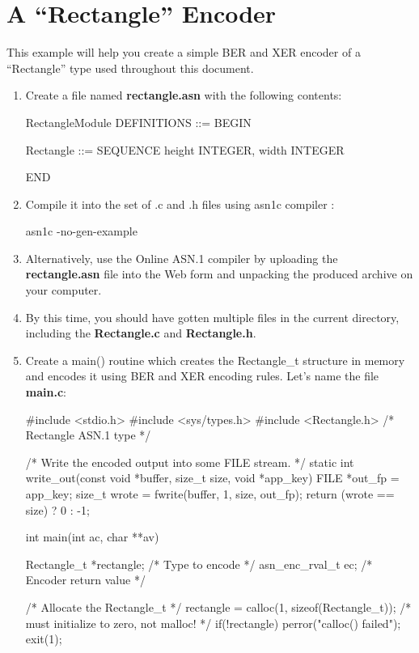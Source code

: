 \documentclass[english,oneside,12pt]{book}
\begin{document}
\section{A “Rectangle” Encoder}

This example will help you create a simple BER and XER encoder of
a ``Rectangle'' type used throughout this document.
\begin{enumerate}
\item Create a file named \textbf{rectangle.asn} with the following contents:

\begin{asn}
RectangleModule DEFINITIONS ::= BEGIN

Rectangle ::= SEQUENCE {
    height  INTEGER,
    width   INTEGER
}

END
\end{asn}
\item Compile it into the set of .c and .h files using asn1c compiler \cite{ASN1C}:

\begin{bash}
asn1c -no-gen-example %
\end{bash}
\item Alternatively, use the Online ASN.1 compiler \cite{AONL} by uploading
the \textbf{rectangle.asn} file into the Web form and unpacking the
produced archive on your computer.
\item By this time, you should have gotten multiple files in the current
directory, including the \textbf{Rectangle.c} and \textbf{Rectangle.h}.
\item Create a main() routine which creates the Rectangle\_t structure in
memory and encodes it using BER and XER encoding rules. Let's name
the file \textbf{main.c}:

\begin{example}
#include <stdio.h>
#include <sys/types.h>
#include <Rectangle.h>   /* Rectangle ASN.1 type  */

/* Write the encoded output into some FILE stream. */
static int write_out(const void *buffer, size_t size, void *app_key) {
    FILE *out_fp = app_key;
    size_t wrote = fwrite(buffer, 1, size, out_fp);
    return (wrote == size) ? 0 : -1;
}
 
int main(int ac, char **av) {
    Rectangle_t *rectangle; /* Type to encode        */
    asn_enc_rval_t ec;      /* Encoder return value  */

    /* Allocate the Rectangle_t */
    rectangle = calloc(1, sizeof(Rectangle_t)); /* must initialize to zero, not malloc! */
    if(!rectangle) {
        perror("calloc() failed");
        exit(1);
    }

}
\end{example}
\end{enumerate}
\end{document}
